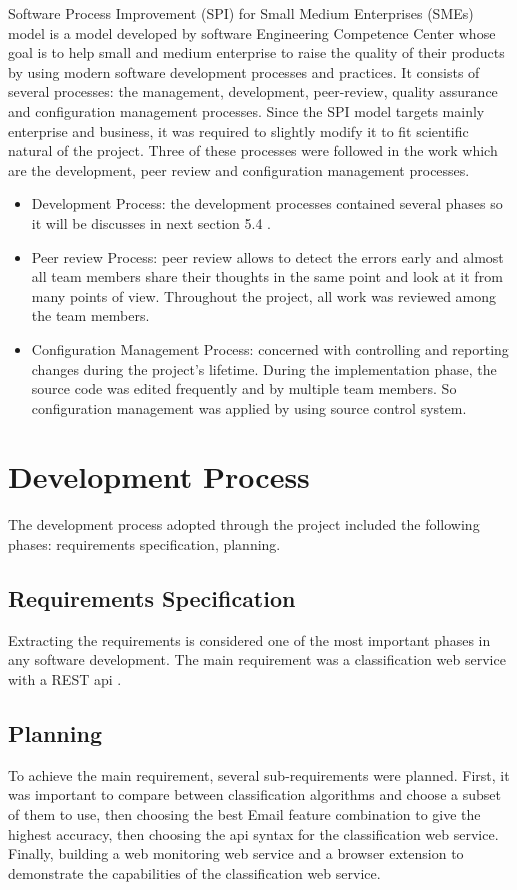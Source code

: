Software Process Improvement (SPI) for Small Medium Enterprises (SMEs)
model is a model developed by software Engineering Competence Center
whose goal is to help small and medium enterprise to raise the quality of
their products by using modern software development processes and practices. It consists of several processes: the management, development, peer-review, quality assurance and configuration management processes. Since
the SPI model targets mainly enterprise and business, it was required to
slightly modify it to fit scientific natural of the project. Three of these processes were followed in the work which are the development, peer review and
configuration management processes.

\begin{itemize}
\item Development Process: the development processes contained several
phases so it will be discusses in next section 5.4 .
\item Peer review Process: peer review allows to detect the errors early and
almost all team members share their thoughts in the same point and
look at it from many points of view. Throughout the project, all work
was reviewed among the team members.
\item Configuration Management Process: concerned with controlling and
reporting changes during the project's lifetime. During the implementation phase, the source code was edited frequently and by multiple
team members. So configuration management was applied by using
source control system.
\end{itemize}

\section{Development Process}

The development process adopted through the project included the following
phases: requirements specification, planning.

\subsection{Requirements Specification}
Extracting the requirements is considered one of the most important phases
in any software development. The main requirement was a classification web service with a REST api \cite{REST}.
\subsection{Planning}
To achieve the main requirement, several sub-requirements were planned.
First, it was important to compare between classification algorithms and choose a subset of them to use,
then choosing the best Email feature combination to give the highest accuracy,
then choosing the api syntax for the classification web service.
Finally, building a web monitoring web service and a browser extension to demonstrate the capabilities of the classification web service.
